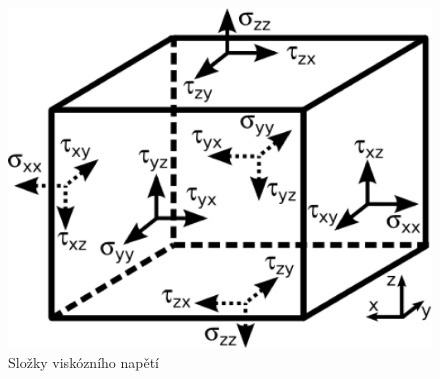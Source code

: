 \begin{figure}[h!]
\begin{center}
  \includegraphics[scale=0.13]{images/stresses.eps}
  \caption{Složky viskózního napětí}
  \label{fig:stresses}
\end{center}
\end{figure} 

